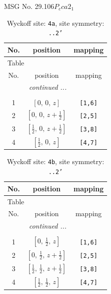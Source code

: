 \documentclass[fleqn,8pt]{jsarticle}
\begin{document}
\setcounter{MaxMatrixCols}{32}

\renewcommand{\tablename}{Table~}
\renewcommand{\figurename}{Figure~}
\begin{center}
\LARGE
MSG No. 29.106\quad$P_{c}ca2_{1}$
\end{center}
\renewcommand{\arraystretch}{1.2}
\begin{longtable}{ccc}
\caption{Wyckoff site: {\tt 4a}, site symmetry: {\tt ..2'}}
 \\
 \hline \hline
No. & position & mapping \\ \hline \endfirsthead

\multicolumn{2}{l}{\tablename\ \thetable{}} \\
 \hline \hline
No. & position & mapping \\ \hline \endhead

 \hline \hline
\multicolumn{2}{r}{\footnotesize\it continued ...} \\ \endfoot

 \hline \hline
\multicolumn{2}{r}{} \\ \endlastfoot

1 & $\left[ 0,\, 0,\, z \right]$ & {\tt [1,6]} \\ \hline
2 & $\left[ 0,\, 0,\, z + \frac{1}{2} \right]$ & {\tt [2,5]} \\ \hline
3 & $\left[ \frac{1}{2},\, 0,\, z + \frac{1}{2} \right]$ & {\tt [3,8]} \\ \hline
4 & $\left[ \frac{1}{2},\, 0,\, z \right]$ & {\tt [4,7]} \\
\end{longtable}
\renewcommand{\arraystretch}{1.2}
\begin{longtable}{ccc}
\caption{Wyckoff site: {\tt 4b}, site symmetry: {\tt ..2'}}
 \\
 \hline \hline
No. & position & mapping \\ \hline \endfirsthead

\multicolumn{2}{l}{\tablename\ \thetable{}} \\
 \hline \hline
No. & position & mapping \\ \hline \endhead

 \hline \hline
\multicolumn{2}{r}{\footnotesize\it continued ...} \\ \endfoot

 \hline \hline
\multicolumn{2}{r}{} \\ \endlastfoot

1 & $\left[ 0,\, \frac{1}{2},\, z \right]$ & {\tt [1,6]} \\ \hline
2 & $\left[ 0,\, \frac{1}{2},\, z + \frac{1}{2} \right]$ & {\tt [2,5]} \\ \hline
3 & $\left[ \frac{1}{2},\, \frac{1}{2},\, z + \frac{1}{2} \right]$ & {\tt [3,8]} \\ \hline
4 & $\left[ \frac{1}{2},\, \frac{1}{2},\, z \right]$ & {\tt [4,7]} \\
\end{longtable}
\end{document}
